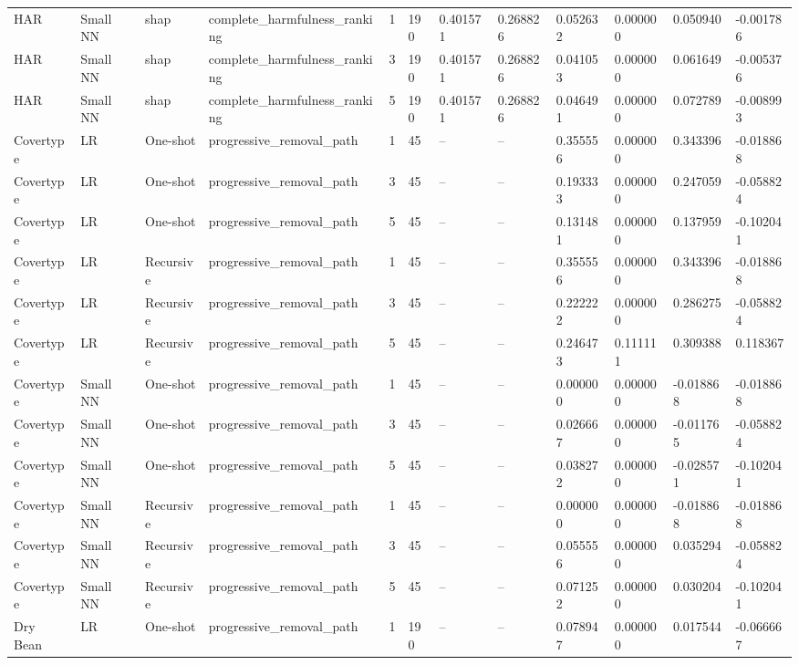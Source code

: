 \begin{table}[t]
\begin{tabular}{llllllllllll}
HAR & Small NN & shap & complete\_harmfulness\_ranking & 1 & 190 & 0.401571 & 0.268826 & 0.052632 & 0.000000 & 0.050940 & -0.001786 \\
HAR & Small NN & shap & complete\_harmfulness\_ranking & 3 & 190 & 0.401571 & 0.268826 & 0.041053 & 0.000000 & 0.061649 & -0.005376 \\
HAR & Small NN & shap & complete\_harmfulness\_ranking & 5 & 190 & 0.401571 & 0.268826 & 0.046491 & 0.000000 & 0.072789 & -0.008993 \\
Covertype & LR & One-shot & progressive\_removal\_path & 1 & 45 & -- & -- & 0.355556 & 0.000000 & 0.343396 & -0.018868 \\
Covertype & LR & One-shot & progressive\_removal\_path & 3 & 45 & -- & -- & 0.193333 & 0.000000 & 0.247059 & -0.058824 \\
Covertype & LR & One-shot & progressive\_removal\_path & 5 & 45 & -- & -- & 0.131481 & 0.000000 & 0.137959 & -0.102041 \\
Covertype & LR & Recursive & progressive\_removal\_path & 1 & 45 & -- & -- & 0.355556 & 0.000000 & 0.343396 & -0.018868 \\
Covertype & LR & Recursive & progressive\_removal\_path & 3 & 45 & -- & -- & 0.222222 & 0.000000 & 0.286275 & -0.058824 \\
Covertype & LR & Recursive & progressive\_removal\_path & 5 & 45 & -- & -- & 0.246473 & 0.111111 & 0.309388 & 0.118367 \\
Covertype & Small NN & One-shot & progressive\_removal\_path & 1 & 45 & -- & -- & 0.000000 & 0.000000 & -0.018868 & -0.018868 \\
Covertype & Small NN & One-shot & progressive\_removal\_path & 3 & 45 & -- & -- & 0.026667 & 0.000000 & -0.011765 & -0.058824 \\
Covertype & Small NN & One-shot & progressive\_removal\_path & 5 & 45 & -- & -- & 0.038272 & 0.000000 & -0.028571 & -0.102041 \\
Covertype & Small NN & Recursive & progressive\_removal\_path & 1 & 45 & -- & -- & 0.000000 & 0.000000 & -0.018868 & -0.018868 \\
Covertype & Small NN & Recursive & progressive\_removal\_path & 3 & 45 & -- & -- & 0.055556 & 0.000000 & 0.035294 & -0.058824 \\
Covertype & Small NN & Recursive & progressive\_removal\_path & 5 & 45 & -- & -- & 0.071252 & 0.000000 & 0.030204 & -0.102041 \\
Dry Bean & LR & One-shot & progressive\_removal\_path & 1 & 190 & -- & -- & 0.078947 & 0.000000 & 0.017544 & -0.066667 \\

\end{tabular}
\end{table}
